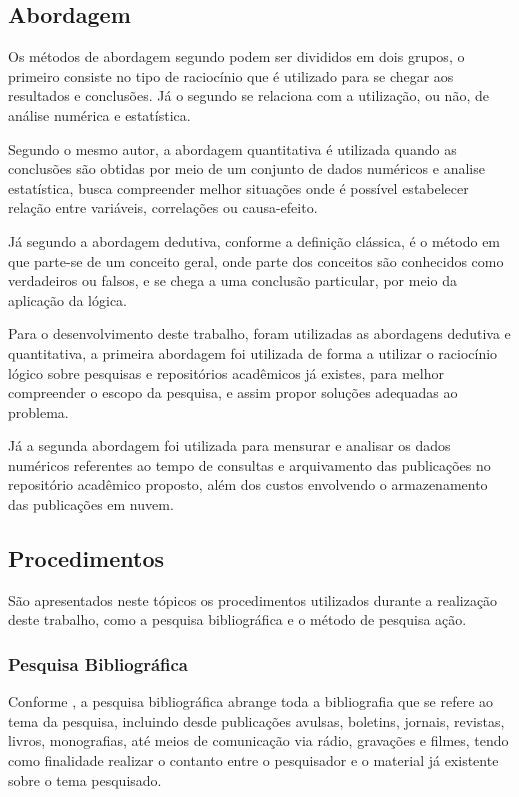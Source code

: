 \subsection{Abordagem}

Os métodos de abordagem segundo \citep[p. 29]{LOVATO:metodologia} podem ser
divididos em dois grupos, o primeiro consiste no tipo de raciocínio que
é utilizado para se chegar aos resultados e conclusões. Já o segundo
se relaciona com a utilização, ou não, de análise numérica e estatística.

Segundo o mesmo autor, a abordagem quantitativa é utilizada quando
as conclusões são obtidas por meio de um conjunto de dados numéricos
e analise estatística, busca compreender melhor situações onde é possível
estabelecer relação entre variáveis, correlações ou causa-efeito.

Já segundo \cite{GIL:metodologia} a abordagem dedutiva, conforme a definição clássica,
é o método em que parte-se de um conceito geral, onde parte dos
conceitos são conhecidos como verdadeiros ou falsos, e se chega
a uma conclusão particular, por meio da aplicação da lógica.

Para o desenvolvimento deste trabalho, foram utilizadas as abordagens
dedutiva e quantitativa, a primeira abordagem foi utilizada
de forma a utilizar o raciocínio lógico sobre pesquisas e repositórios
acadêmicos já existes, para melhor compreender o escopo da pesquisa,
e assim propor soluções adequadas ao problema.

Já a segunda abordagem foi utilizada para mensurar e analisar
os dados numéricos referentes ao tempo de consultas e arquivamento
das publicações no repositório acadêmico proposto, além dos
custos envolvendo o armazenamento das publicações em nuvem.

\subsection{Procedimentos}

São apresentados neste tópicos os procedimentos utilizados
durante a realização deste trabalho, como a pesquisa bibliográfica e
o método de pesquisa ação.

\subsubsection{Pesquisa Bibliográfica}

Conforme \citep[p. 183]{LAKATOS2003:metodologia}, a pesquisa bibliográfica
abrange toda a bibliografia que se refere ao tema da pesquisa,
incluindo desde publicações avulsas, boletins, jornais, revistas,
livros, monografias, até meios de comunicação via rádio,
gravações e filmes, tendo como finalidade realizar o contanto
entre o pesquisador e o material já existente sobre o tema pesquisado.

